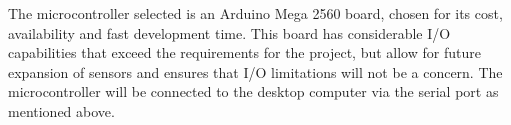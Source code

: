 \documentclass[main.tex]{subfiles}
\begin{document}
The microcontroller selected is an Arduino Mega 2560 board, chosen for its cost, availability and fast development time. This board has considerable I/O capabilities that exceed the requirements for the project, but allow for future expansion of sensors and ensures that I/O limitations will not be a concern. The microcontroller will be connected to the desktop computer via the serial port as mentioned above.
\end{document}

